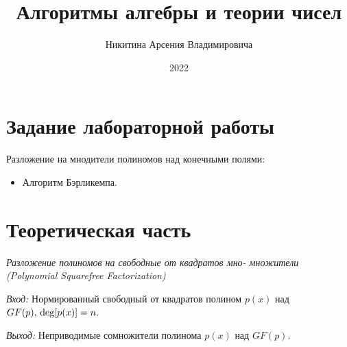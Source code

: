 \documentclass[bachelor, och, labwork]{shiza}
\begin{document}
\title{Алгоритмы алгебры и теории чисел}





\author{Никитина Арсения Владимировича}




\date{2022}

\maketitle



\tableofcontents

\section{Задание лабораторной работы}

Разложение на мнодители полиномов над конечными полями:

\begin{itemize}
    \item Алгоритм Бэрликемпа.
\end{itemize}

\section{Теоретическая часть}

\begin{center}
    \textit{Разложение полиномов на свободные от квадратов мно-
множители (Polynomial Squarefree Factorization)}
\end{center}

\textit{Вход:} Нормированный свободный от квадратов полином $p(x)$ над $GF(p),\\
\deg [p(x)]= n.$

\textit{Выход:} Неприводимые сомножители полинома $p(x)$ над $GF(p)$.
\end{document}
